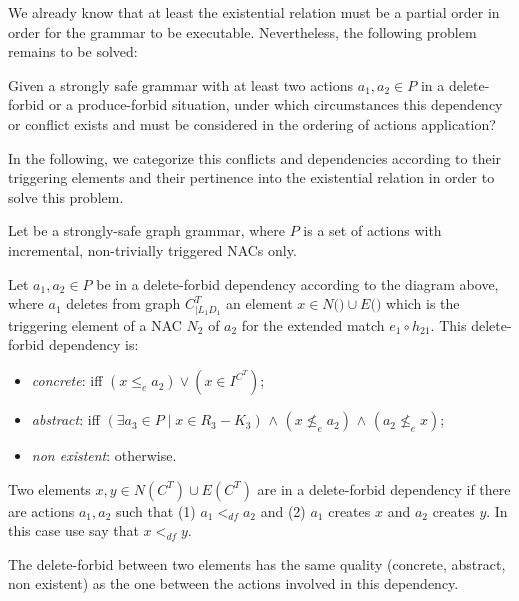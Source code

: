 We already know that at least the existential relation must be a partial order in order for the grammar to be executable. Nevertheless, the following problem remains to be solved:

\begin{intuition}
  Given a strongly safe grammar \doublyTypedGraphGrammarCore{} with at least two actions $a_1, a_2 \in P$ in a delete-forbid or a produce-forbid situation, under which circumstances this dependency or conflict exists and must be considered in the ordering of actions application?
\end{intuition}

In the following, we categorize this conflicts and dependencies according to their triggering elements and their pertinence into the existential relation in order to solve this problem.

\begin{definition}\label{def:delete-forbid-strong} Let \doublyTypedGraphGrammarCore{} be a strongly-safe graph grammar, where $P$ is a set of actions with incremental, non-trivially triggered NACs only.

\hfill

  Let $a_1, a_2 \in P$ be in a delete-forbid dependency according to the diagram above, where $a_1$ deletes from graph $C^T_{|L_1D_1}$ an element $x \in N($\coreGraph$) \cup E($\coreGraph$)$ which is the triggering element of a NAC $N_2$ of $a_2$ for the extended match $e_1 \circ h_{21}$. This delete-forbid dependency is:

\begin{itemize}
  \item \emph{concrete}: iff $(x \leq_e a_2) \lor (x \in I^{C^T})$;
  \item \emph{abstract}: iff $(\exists a_3 \in P \mid x \in R_3 - K_3)$ $\land$ $(x \not\leq_e a_2)$ $\land$ $(a_2 \not\leq_e x)$;%
  \item \emph{non existent}: otherwise.
\end{itemize}

  Two elements $x, y \in N(C^T) \cup E(C^T)$ are in a delete-forbid dependency if there are actions $a_1,a_2$ such that (1) $a_1 <_{df} a_2$ and (2) $a_1$ creates $x$ and $a_2$ creates $y$. In this case use say that $x <_{df} y$.

  The delete-forbid between two elements has the same quality (concrete, abstract, non existent) as the one between the actions involved in this dependency.
\end{definition}

